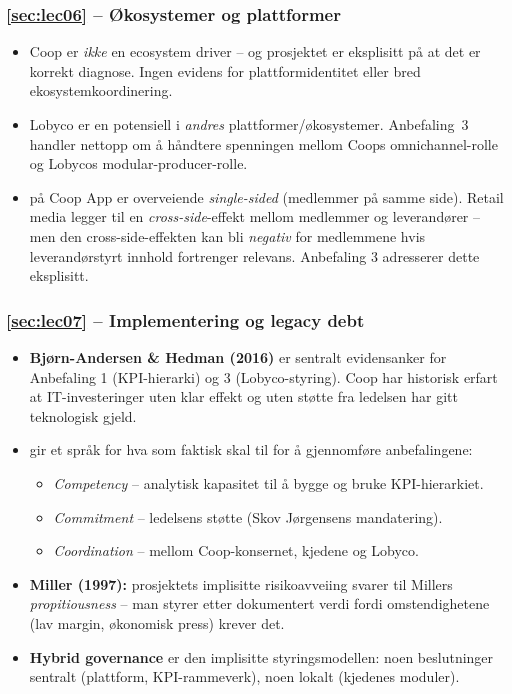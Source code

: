 \subsubsection*{\autoref{sec:lec06} -- Økosystemer og plattformer}
\begin{itemize}
  \item Coop er \emph{ikke} en ecosystem driver -- og prosjektet er
    eksplisitt på at det er korrekt diagnose. Ingen evidens for
    plattformidentitet eller bred ekosystemkoordinering.
  \item Lobyco er en potensiell  i \emph{andres}
    plattformer/økosystemer. Anbefaling~3 handler nettopp om å håndtere
    spenningen mellom Coops omnichannel-rolle og Lobycos
    modular-producer-rolle.
  \item {} på Coop App er overveiende
    \emph{single-sided} (medlemmer på samme side). Retail media legger til
    en \emph{cross-side}-effekt mellom medlemmer og leverandører -- men den
    cross-side-effekten kan bli \emph{negativ} for medlemmene hvis
    leverandørstyrt innhold fortrenger relevans. Anbefaling 3 adresserer
    dette eksplisitt.
\end{itemize}

\subsubsection*{\autoref{sec:lec07} -- Implementering og legacy debt}
\begin{itemize}
  \item \textbf{Bjørn-Andersen \& Hedman (2016)} er sentralt evidensanker for
    Anbefaling 1 (KPI-hierarki) og 3 (Lobyco-styring). Coop har historisk
    erfart at IT-investeringer uten klar effekt og uten støtte fra ledelsen
    har gitt teknologisk gjeld.
  \item \textbf{} gir et språk for hva som faktisk skal
    til for å gjennomføre anbefalingene:
  \begin{itemize}
    \item \emph{Competency} -- analytisk kapasitet til å bygge og bruke
      KPI-hierarkiet.
    \item \emph{Commitment} -- ledelsens støtte (Skov Jørgensens
      mandatering).
    \item \emph{Coordination} -- mellom Coop-konsernet, kjedene og Lobyco.
  \end{itemize}
  \item \textbf{Miller (1997):} prosjektets implisitte risikoavveiing svarer
    til Millers \emph{propitiousness} -- man styrer etter dokumentert verdi
    fordi omstendighetene (lav margin, økonomisk press) krever det.
  \item \textbf{Hybrid governance} er den implisitte styringsmodellen: noen
    beslutninger sentralt (plattform, KPI-rammeverk), noen lokalt (kjedenes
    moduler).
\end{itemize}

